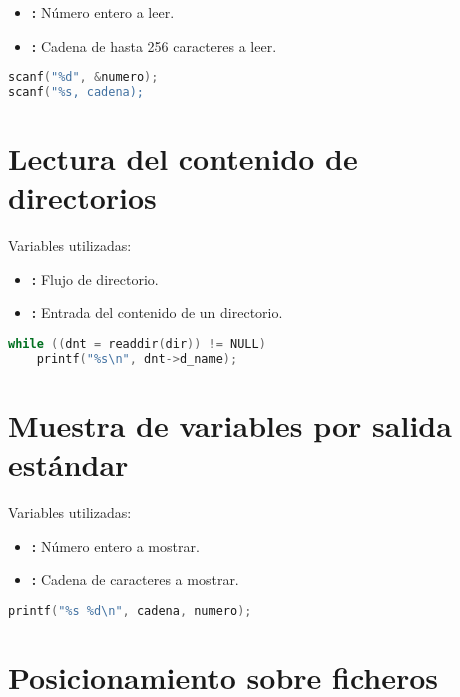 \begin{itemize}
	\item{}\textbf{:} Número entero a leer.
	\item{}\textbf{:} Cadena de hasta 256 caracteres a leer.
\end{itemize}

\begin{lstlisting}[language=C]
scanf("%d", &numero);
scanf("%s, cadena);
\end{lstlisting}

\section{Lectura del contenido de directorios}

Variables utilizadas:

\begin{itemize}
	\item{}\textbf{:} Flujo de directorio.
	\item{}\textbf{:} Entrada del contenido de un directorio.
\end{itemize}

\begin{lstlisting}[language=C]
while ((dnt = readdir(dir)) != NULL)
	printf("%s\n", dnt->d_name);
\end{lstlisting}

\pagebreak

\section{Muestra de variables por salida estándar}

Variables utilizadas:

\begin{itemize}
	\item{}\textbf{:} Número entero a mostrar.
	\item{}\textbf{:} Cadena de caracteres a mostrar.
\end{itemize}

\begin{lstlisting}[language=C]
printf("%s %d\n", cadena, numero);
\end{lstlisting}

\section{Posicionamiento sobre ficheros}

